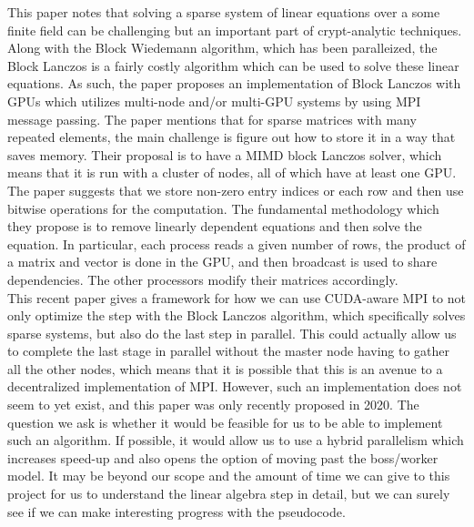 \documentclass[11pt,twocolumn]{article}
\begin{document}
This paper notes that solving a sparse system of linear equations over a some finite field can be challenging but an important part of crypt-analytic techniques. Along with the Block Wiedemann algorithm, which has been paralleized, the Block Lanczos is a fairly costly algorithm which can be used to solve these linear equations. As such, the paper proposes an implementation of Block Lanczos with GPUs which utilizes multi-node and/or multi-GPU systems by using MPI message passing. The paper mentions that for sparse matrices with many repeated elements, the main challenge is figure out how to store it in a way that saves memory. Their proposal is to have a MIMD block Lanczos solver, which means that it is run with a cluster of nodes, all of which have at least one GPU. The paper suggests that we store non-zero entry indices or each row and then use bitwise operations for the computation. The fundamental methodology which they propose is to remove linearly dependent equations and then solve the equation. In particular, each process reads a given number of rows, the product of a matrix and vector is done in the GPU, and then broadcast is used to share dependencies. The other processors modify their matrices accordingly. \\
\indent This recent paper gives a framework for how we can use CUDA-aware MPI to not only optimize the step with the Block Lanczos algorithm, which specifically solves sparse systems, but also do the last step in parallel. This could actually allow us to complete the last stage in parallel without the master node having to gather all the other nodes, which means that it is possible that this is an avenue to a decentralized implementation of MPI. However, such an implementation does not seem to yet exist, and this paper was only recently proposed in 2020. The question we ask is whether it would be feasible for us to be able to implement such an algorithm. If possible, it would allow us to use a hybrid parallelism which increases speed-up and also opens the option of moving past the boss/worker model. It may be beyond our scope and the amount of time we can give to this project for us to understand the linear algebra step in detail, but we can surely see if we can make interesting progress with the pseudocode. \\
\end{document}
